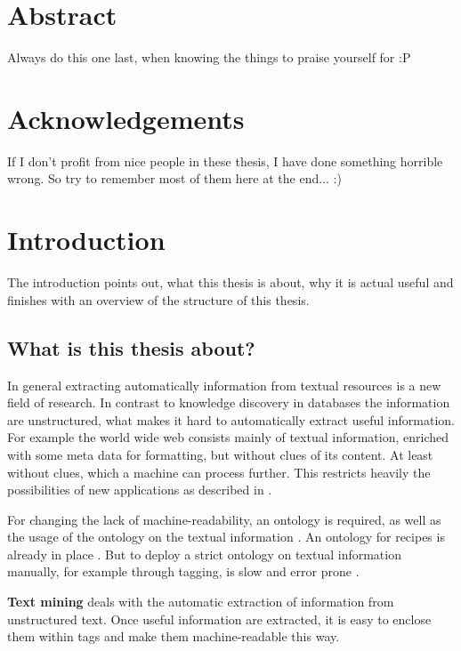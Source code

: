 \documentclass[12pt, twoside]{report}
\begin{document}
\chapter*{Abstract}
Always do this one last, when knowing the things to praise  yourself for :P

\chapter*{Acknowledgements}
If I don't profit from nice people in these thesis, I have done something horrible wrong. So try to remember most of them here at the end... :)

\tableofcontents



\chapter{Introduction}

The introduction points out, what this thesis is about, why it is actual useful and finishes with an overview of the structure of this thesis.

\section{What is this thesis about?}
In general extracting automatically information from textual resources is a new field of research. In contrast to knowledge discovery in databases the information are unstructured, what makes it hard to automatically extract useful information. For example the world wide web consists mainly of textual information, enriched with some meta data for formatting, but without clues of its content. At least without clues, which a machine can process further. This restricts heavily the possibilities of new applications as described in \parencite{semanticWeb}.

For changing the lack of machine-readability, an ontology is required, as well as the usage of the ontology on the textual information \parencite{semanticWeb}. An ontology for recipes is already in place \parencite{schemaRecipe}. But to deploy a strict ontology on textual information manually, for example through tagging, is slow and error prone \parencite{manualTagging}.

\textbf{Text mining} deals with the automatic extraction of information from unstructured text. Once useful information are extracted, it is easy to enclose them within tags and make them machine-readable this way.
\end{document}
